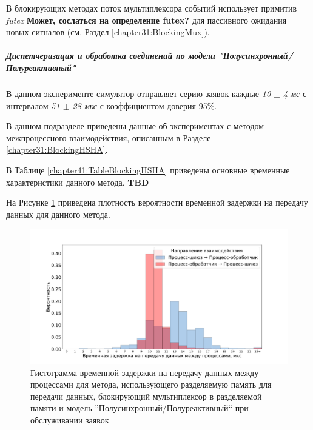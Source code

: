 В блокирующих методах поток мультиплексора событий использует примитив \textit{futex} \textbf{Может, сослаться на определение futex?} для пассивного ожидания новых сигналов (см. Раздел \ref{chapter31:BlockingMux}).

\subparagraph{Диспетчеризация и обработка соединений по модели "Полусинхронный/Полуреактивный"}

В данном эксперименте симулятор отправляет серию заявок каждые \textit{10 $\pm$ 4 мс} с интервалом \textit{51 $\pm$ 28 мкс} с коэффициентом доверия 95\%.

В данном подразделе приведены данные об экспериментах с методом межпроцессного взаимодействия, описанным в Разделе \ref{chapter31:BlockingHSHA}.

В Таблице \ref{chapter41:TableBlockingHSHA} приведены основные временные характеристики данного метода. \textbf{TBD}

На Рисунке \ref{chapter41:FigBlockingHSHA} приведена плотность вероятности временной задержки на передачу данных для данного метода.

\begin{figure}[!h]
\caption{Гистограмма временной задержки на передачу данных между процессами для метода, использующего разделяемую память для передачи данных, блокирующий мультиплексор в разделяемой памяти и модель ''Полусинхронный/Полуреактивный`` при обслуживании заявок}
\label{chapter41:FigBlockingHSHA}
\includegraphics[width=\textwidth]{../../graphics/hist/BlockingHSHA}
\end{figure}
%


